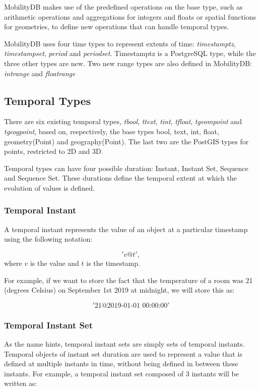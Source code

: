 MobilityDB makes use of the predefined operations on the base type, such as arithmetic operations and aggregations for integers and floats or spatial functions for geometries, to define new operations that can handle temporal types.

MobilityDB uses four time types to represent extents of time: \textit{timestamptz}, \textit{timestampset}, \textit{period} and \textit{periodset}. Timestamptz is a PostgreSQL type, while the three other types are new. Two new range types are also defined in MobilityDB: \textit{intrange} and \textit{floatrange}

\subsection{Temporal Types}
\label{section:mobilitydb_ttypes}

There are six existing temporal types, \textit{tbool}, \textit{ttext}, \textit{tint}, \textit{tfloat}, \textit{tgeompoint} and \textit{tgeogpoint}, based on, respectively, the base types bool, text, int, float, geometry(Point) and geography(Point). The last two are the PostGIS types for points, restricted to 2D and 3D.

Temporal types can have four possible duration: Instant, Instant Set, Sequence and Sequence Set. These durations define the temporal extent at which the evolution of values is defined.

\subsubsection{Temporal Instant}
\label{section:mobilitydb_inst}

A temporal instant represents the value of an object at a particular timestamp using the following notation:

\[
    'v@t',
\]
where \(v\) is the value and \(t\) is the timestamp.

For example, if we want to store the fact that the temperature of a room was 21 (degrees Celsius) on September 1st 2019 at midnight, we will store this as:

\[
    '21@\text{2019-01-01 00:00:00}'
\]

\subsubsection{Temporal Instant Set}
\label{section:mobilitydb_i}

As the name hints, temporal instant sets are simply sets of temporal instants. Temporal objects of instant set duration are used to represent a value that is defined at multiple instants in time, without being defined in between these instants. For example, a temporal instant set composed of 3 instants will be written as:

